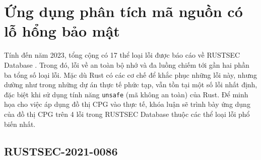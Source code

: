 \section{Ứng dụng phân tích mã nguồn có lỗ hổng bảo mật}

Tính đến năm 2023, tổng cộng có 17 thể loại lỗi được báo cáo về RUSTSEC Database \cite{zheng2023closer}.
Trong đó, lỗi về an toàn bộ nhớ và đa luồng chiếm tới gần hai phần ba tổng số loại lỗi.
Mặc dù Rust có các cơ chế để khắc phục những lỗi này, nhưng dường như trong những dự án thực tế phức tạp, vẫn tồn tại một số lỗi nhất định, đặc biệt khi sử dụng tính năng \texttt{unsafe} (mã không an toàn) của Rust.
Để minh họa cho việc áp dụng đồ thị CPG vào thực tế, khóa luận sẽ trình bày ứng dụng của đồ thị CPG trên 4 lỗi trong RUSTSEC Database thuộc các thể loại lỗi phổ biến nhất.

\subsection{RUSTSEC-2021-0086}



